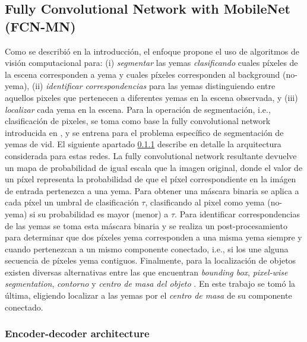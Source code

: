 \documentclass[a4paper,authoryear,review]{elsarticle}
\begin{document}
	
	
	
	
	\subsection{Fully Convolutional Network with MobileNet (FCN-MN)} 
	\label{sec:fcn}
	
	
	Como se describió en la introducción, el enfoque propone el uso de algoritmos de visión computacional para: (i) \emph{segmentar} las yemas \emph{clasificando} cuales píxeles de la escena corresponden a yema y cuales píxeles corresponden al background (no-yema), (ii) \emph{identificar correspondencias} para las yemas distinguiendo entre aquellos pixeles que pertenecen a diferentes yemas en la escena observada, y (iii) \emph{localizar} cada yema en la escena. 
	Para la operación de segmentación, i.e., clasificación de pixeles, se toma como base la fully convolutional network introducida en \citep{long2015fully}, y se entrena para el problema específico de segmentación de yemas de vid. El siguiente apartado \ref{sec:fcnmn} describe en detalle la arquitectura considerada para estas redes.
	La fully convolutional network resultante devuelve un mapa de probabilidad de igual escala que la imagen original, donde el valor de un píxel representa la probabilidad de que el píxel correspondiente en la imágen de entrada pertenezca a una yema. 
	Para obtener una máscara binaria se aplica a cada píxel un umbral de clasificación $\tau$, clasificando al pixel como yema (no-yema) si su probabilidad es mayor (menor) a $\tau$. 
	Para identificar correspondencias de las yemas se toma esta máscara binaria y se realiza un post-procesamiento para determinar que dos píxeles yema corresponden a una misma yema siempre y cuando pertenezcan a un mismo componente conectado, i.e., si los une alguna secuencia de píxeles yema contiguos. 
	Finalmente, para la localización de objetos existen diversas alternativas entre las que encuentran \emph{bounding box}, \emph{pixel-wise segmentation}, \emph{contorno} y \emph{centro de masa del objeto} \citep{lampert2008beyond}. En este trabajo se tomó la última, eligiendo localizar a las yemas por el \emph{centro de masa} de su componente conectado. 
	
	
	\subsubsection {Encoder-decoder architecture}  \label{sec:fcnmn}
	
\end{document}
